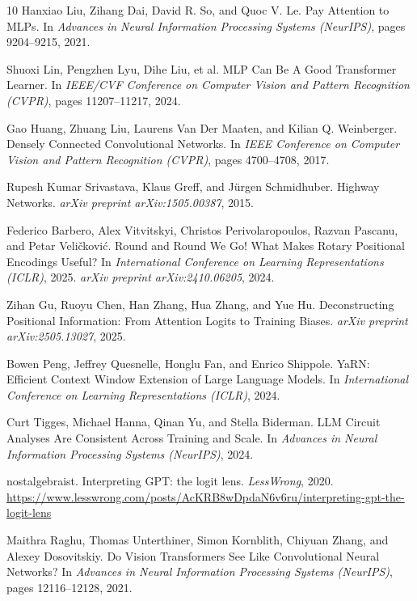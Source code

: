 \documentclass[11pt]{article}
\theoremstyle{definition}
\begin{document}
\begin{thebibliography}{10}
Hanxiao Liu, Zihang Dai, David R. So, and Quoc V. Le.
\newblock Pay Attention to MLPs.
\newblock In \emph{Advances in Neural Information Processing Systems (NeurIPS)}, pages 9204--9215, 2021.

Shuoxi Lin, Pengzhen Lyu, Dihe Liu, et al.
\newblock MLP Can Be A Good Transformer Learner.
\newblock In \emph{IEEE/CVF Conference on Computer Vision and Pattern Recognition (CVPR)}, pages 11207--11217, 2024.

Gao Huang, Zhuang Liu, Laurens Van Der Maaten, and Kilian Q. Weinberger.
\newblock Densely Connected Convolutional Networks.
\newblock In \emph{IEEE Conference on Computer Vision and Pattern Recognition (CVPR)}, pages 4700--4708, 2017.

Rupesh Kumar Srivastava, Klaus Greff, and J{\"u}rgen Schmidhuber.
\newblock Highway Networks.
\newblock \emph{arXiv preprint arXiv:1505.00387}, 2015.

Federico Barbero, Alex Vitvitskyi, Christos Perivolaropoulos, Razvan Pascanu, and Petar Veli\v{c}kovi\'c.
\newblock Round and Round We Go! What Makes Rotary Positional Encodings Useful?
\newblock In \emph{International Conference on Learning Representations (ICLR)}, 2025.
\newblock \emph{arXiv preprint arXiv:2410.06205}, 2024.

Zihan Gu, Ruoyu Chen, Han Zhang, Hua Zhang, and Yue Hu.
\newblock Deconstructing Positional Information: From Attention Logits to Training Biases.
\newblock \emph{arXiv preprint arXiv:2505.13027}, 2025.

Bowen Peng, Jeffrey Quesnelle, Honglu Fan, and Enrico Shippole.
\newblock YaRN: Efficient Context Window Extension of Large Language Models.
\newblock In \emph{International Conference on Learning Representations (ICLR)}, 2024.

Curt Tigges, Michael Hanna, Qinan Yu, and Stella Biderman.
\newblock LLM Circuit Analyses Are Consistent Across Training and Scale.
\newblock In \emph{Advances in Neural Information Processing Systems (NeurIPS)}, 2024.

nostalgebraist.
\newblock Interpreting GPT: the logit lens.
\newblock \emph{LessWrong}, 2020.
\newblock \url{https://www.lesswrong.com/posts/AcKRB8wDpdaN6v6ru/interpreting-gpt-the-logit-lens}

Maithra Raghu, Thomas Unterthiner, Simon Kornblith, Chiyuan Zhang, and Alexey Dosovitskiy.
\newblock Do Vision Transformers See Like Convolutional Neural Networks?
\newblock In \emph{Advances in Neural Information Processing Systems (NeurIPS)}, pages 12116--12128, 2021.


\end{thebibliography}
\end{document}
